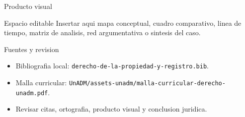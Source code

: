 \documentclass[
  spanish,
  aspectratio=169,
  xcolor={dvipsnames,table}
]{beamer}
\begin{document}
\begin{frame}{Producto visual}
  \begin{block}{Espacio editable}
    Insertar aqui mapa conceptual, cuadro comparativo, linea de tiempo,
    matriz de analisis, red argumentativa o sintesis del caso.
  \end{block}
  \centering
\end{frame}

\begin{frame}{Fuentes y revision}
  \begin{itemize}
    \item Bibliografia local: \texttt{derecho-de-la-propiedad-y-registro.bib}.
    \item Malla curricular: \texttt{UnADM/assets-unadm/malla-curricular-derecho-unadm.pdf}.
    \item Revisar citas, ortografia, producto visual y conclusion juridica.
  \end{itemize}
\end{frame}
\end{document}
